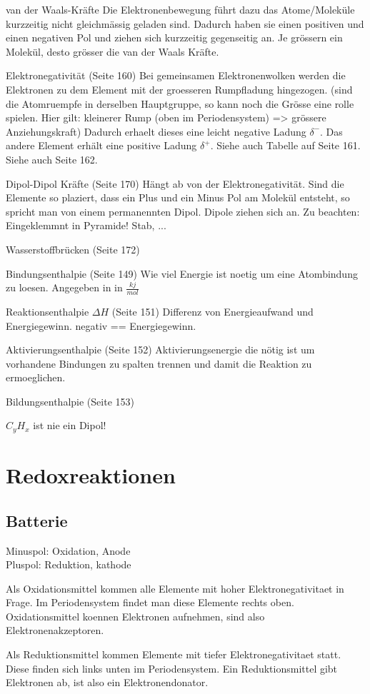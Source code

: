 \documentclass[11pt,paper=a4,final]{scrartcl}
\begin{document}
\begin{description*}
  \item[van der Waals-Kr\"afte] Die Elektronenbewegung f\"uhrt dazu das
  Atome/Molek\"ule kurzzeitig nicht gleichm\"assig geladen sind. Dadurch haben
  sie einen positiven und einen negativen Pol und ziehen sich kurzzeitig
  gegenseitig an. Je gr\"ossern ein Molek\"ul, desto gr\"osser die van der Waals
  Kr\"afte. 
  \item[Elektronegativit\"at] (Seite 160) Bei gemeinsamen Elektronenwolken
  werden die Elektronen zu dem Element mit der groesseren Rumpfladung
  hingezogen. (sind die Atomruempfe in derselben Hauptgruppe, so kann noch die
  Gr\"osse eine rolle spielen. Hier gilt: kleinerer Rump (oben im
  Periodensystem) => gr\"ossere Anziehungskraft) Dadurch erhaelt dieses eine
  leicht negative Ladung \(\delta^-\). Das andere Element erh\"alt eine positive
  Ladung \(\delta^+\). Siehe auch Tabelle auf Seite 161. Siehe auch Seite 162.
  \item[Dipol-Dipol Kr\"afte] (Seite 170) H\"angt ab von der
  Elektronegativit\"at. Sind die Elemente so plaziert, dass ein Plus und ein
  Minus Pol am Molek\"ul entsteht, so spricht man von einem permanennten Dipol.
  Dipole ziehen sich an. Zu beachten: Eingeklemmnt in Pyramide! Stab, ... 
  \item[Wasserstoffbr\"ucken] (Seite 172)
  \item[Bindungsenthalpie] (Seite 149) Wie viel Energie ist noetig um eine
  Atombindung zu loesen. Angegeben in in \(\frac{kj}{mol}\)
  \item[Reaktionsenthalpie \(\Delta H\)] (Seite 151) Differenz von
  Energieaufwand und Energiegewinn. negativ == Energiegewinn.
  \item[Aktivierungsenthalpie] (Seite 152) Aktivierungsenergie die n\"otig ist
  um vorhandene Bindungen zu spalten trennen und damit die Reaktion zu
  ermoeglichen.
  \item[Bildungsenthalpie] (Seite 153)
\end{description*}
\(C_yH_x\) ist nie ein Dipol!
\section{Redoxreaktionen}
\subsection{Batterie}
Minuspol: Oxidation, Anode\\
Pluspol: Reduktion, kathode

Als Oxidationsmittel kommen alle Elemente mit hoher Elektronegativitaet in
Frage. Im Periodensystem findet man diese Elemente rechts oben. Oxidationsmittel
koennen Elektronen aufnehmen, sind also Elektronenakzeptoren.

Als Reduktionsmittel kommen Elemente mit tiefer Elektronegativitaet statt. Diese
finden sich links unten im Periodensystem. Ein Reduktionsmittel gibt Elektronen
ab, ist also ein Elektronendonator.
\end{document}
